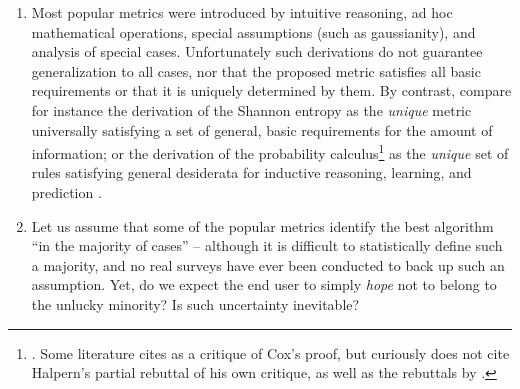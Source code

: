 \documentclass[\ifafour a4paper,12pt,\else a5paper,10pt,\fi%
onecolumn,oneside,article,%
british%
]{memoir}
\theoremstyle{remark}
\theoremstyle{innote}
\renewcommand*{\|}[1][]{\nonscript\:#1\vert\nonscript\:\mathopen{}}
\newcommand*{\sect}{\S}%
\newcommand*{\chap}{ch.}%
\newcommand*{\chaps}{chs}%
\begin{document}
\begin{enumerate}
\item\label{item:ad_hoc} Most popular metrics were introduced by intuitive reasoning, ad hoc mathematical operations, special assumptions (such as gaussianity\autocites[e.g.][\sect~31 p.~183 for the Matthews correlation coefficient]{fisher1925_r1963}), and analysis of special cases. Unfortunately such derivations do not guarantee generalization to all cases, nor that the proposed metric satisfies all basic requirements or that it is uniquely determined by them. By contrast, compare for instance the derivation of the Shannon entropy \autocites{shannon1948}[\sect~3.2]{woodward1953_r1964}[also][]{goodetal1968} as the \emph{unique} metric universally satisfying a set of general, basic requirements for the amount of information; or the derivation of the probability calculus\footnote{\cites{cox1946,fine1973}[\chaps~1--2]{jaynes1994_r2003}. Some literature cites \textcites{halpern1999} as a critique of Cox's proof, but curiously does not cite Halpern's \parencites*{halpern1999b} partial rebuttal of his own critique, as well as the rebuttals by \textcites{snow1998,snow2001}.} as the \emph{unique} set of rules satisfying general desiderata for inductive reasoning, learning, and prediction \autocites{selfetal1987,cheeseman1988}[\chap~12]{russelletal1995_r2022}.
  
\item\label{item:hope_medical} Let us assume that some of the popular metrics identify the best algorithm \enquote{in the majority of cases} -- although it is difficult to statistically define such a majority, and no real surveys have ever been conducted to back up such an assumption. Yet, do we expect the end user to simply \emph{hope} not to belong to the unlucky minority? Is such uncertainty inevitable?


\end{enumerate}
\end{document}
